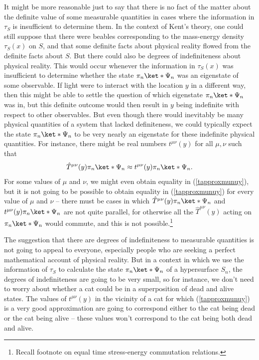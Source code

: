\documentclass[12pt]{report}
\begin{document}
It might be more reasonable just to say that there is no fact of the matter about the definite value of some measurable quantities in cases where the information in $\tau_S$ is insufficient to determine them.  In the context of Kent's theory, one could still suppose that there were beables corresponding to the mass-energy density $\tau_S(x)$ on $S$, and that some definite facts about physical reality flowed from the definite facts about $S$. But there could also be degrees of indefiniteness about physical reality. This would occur whenever the information in $\tau_S(x)$ was insufficient to determine whether the state $\pi_n\ket*{\Psi_n}$ was an eigenstate of some observable. If light were to interact with the location $y$ in a different way, then this might be able to settle the question of which eigenstate $\pi_n\ket*{\Psi_n}$ was in, but this definite outcome would then result in $y$ being indefinite with respect to other observables. But even though there would inevitably be many physical quantities of a system that lacked definiteness, we could typically expect the state $\pi_n\ket*{\Psi_n}$ to be very nearly an eigenstate for these indefinite physical quantities. For instance, there might be real numbers $t^{\mu\nu}(y)$ %
%
 for all $\mu, \nu$ such that 
\begin{equation}\label{tapproxmunuy}
\hat{T}^{\mu\nu}(y)\pi_n\ket*{\Psi_n}\approx t^{\mu\nu}(y)\pi_n\ket*{\Psi_n}.
\end{equation}
For some values of $\mu$ and $\nu$, we might even obtain equality in (\ref{tapproxmunuy}), but it is not going to be possible to obtain equality in (\ref{tapproxmunuy}) for every value of $\mu$ and $\nu$ -- there must be cases in which $\hat{T}^{\mu\nu}(y)\pi_n\ket*{\Psi_n}$ and $t^{\mu\nu}(y)\pi_n\ket*{\Psi_n}$ are not quite parallel, for otherwise all the $\hat{T}^{\mu\nu}(y)$  acting on $\pi_n\ket*{\Psi_n}$ would commute, and this is not possible.\footnote{Recall footnote  on equal time stress-energy commutation relations.}

The suggestion that there are degrees of indefiniteness to measurable quantities is not going to appeal to everyone, especially people who are seeking a perfect mathematical account of physical reality. But in a context in which we use the information of $\tau_S$ to calculate the state $\pi_n\ket*{\Psi_n}$ of a hypersurface $S_n$, the degrees of indefiniteness are going to be very small, so for instance, we don't need to worry about whether a cat could be in a superposition of dead and alive states. The values of $t^{\mu\nu}(y)$ in the vicinity of a cat for which (\ref{tapproxmunuy}) is a very good approximation are going to correspond either to the cat being dead or the cat being alive -- these values won't correspond to the cat being both dead and alive.
\end{document}
